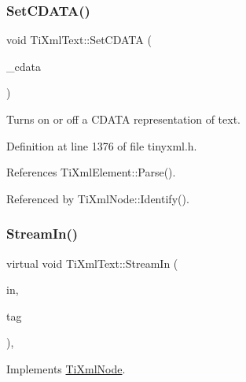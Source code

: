 \hypertarget{class_ti_xml_text_acb17ff7c5d09b2c839393445a3de5ea9}{}\label{class_ti_xml_text_acb17ff7c5d09b2c839393445a3de5ea9} 
\subsubsection{\texorpdfstring{Set\+C\+D\+A\+T\+A()}{SetCDATA()}}
{\footnotesize\ttfamily void Ti\+Xml\+Text\+::\+Set\+C\+D\+A\+TA (\begin{DoxyParamCaption}\item[{bool}]{\+\_\+cdata }\end{DoxyParamCaption})\hspace{0.3cm}{\ttfamily [inline]}}



Turns on or off a C\+D\+A\+TA representation of text. 



Definition at line 1376 of file tinyxml.\+h.



References Ti\+Xml\+Element\+::\+Parse().



Referenced by Ti\+Xml\+Node\+::\+Identify().

\hypertarget{class_ti_xml_text_ab0ad9f14fd41689ced26f21a5c8919b4}{}\label{class_ti_xml_text_ab0ad9f14fd41689ced26f21a5c8919b4} 
\subsubsection{\texorpdfstring{Stream\+In()}{StreamIn()}}
{\footnotesize\ttfamily virtual void Ti\+Xml\+Text\+::\+Stream\+In (\begin{DoxyParamCaption}\item[{std\+::istream $\ast$}]{in,  }\item[{\hyperlink{tinyxml_8h_a92bada05fd84d9a0c9a5bbe53de26887}{T\+I\+X\+M\+L\+\_\+\+S\+T\+R\+I\+NG} $\ast$}]{tag }\end{DoxyParamCaption})\hspace{0.3cm}{\ttfamily [protected]}, {\ttfamily [virtual]}}



Implements \hyperlink{class_ti_xml_node_ab4b4af1a6b486dcbc0e327cf291270af}{Ti\+Xml\+Node}.




